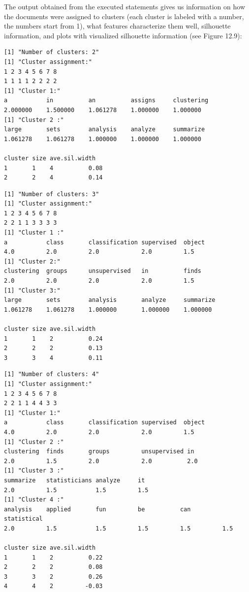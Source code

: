 The output obtained from the executed statements gives us information on how the documents were assigned to clusters (each cluster is labeled with a number, the numbers start from 1), what features characterize them well, silhouette information, and plots with visualized silhouette information (see Figure 12.9):

\begin{lstlisting}
[1] "Number of clusters: 2"
[1] "Cluster assignment:"
1 2 3 4 5 6 7 8
1 1 1 1 2 2 2 2
[1] "Cluster 1:"
a           in          an          assigns     clustering
2.000000    1.500000    1.061278    1.000000    1.000000
[1] "Cluster 2 :"
large       sets        analysis    analyze     summarize
1.061278    1.061278    1.000000    1.000000    1.000000

cluster size ave.sil.width
1       1    4          0.08
2       2    4          0.14
\end{lstlisting}

\begin{lstlisting}
[1] "Number of clusters: 3"
[1] "Cluster assignment:"
1 2 3 4 5 6 7 8
2 2 1 1 3 3 3 3
[1] "Cluster 1 :"
a           class       classification supervised  object
4.0         2.0         2.0            2.0         1.5
[1] "Cluster 2:"
clustering  groups      unsupervised   in          finds
2.0         2.0         2.0            2.0         1.5
[1] "Cluster 3:"
large       sets        analysis       analyze     summarize
1.061278    1.061278    1.000000       1.000000    1.000000

cluster size ave.sil.width
1       1    2          0.24
2       2    2          0.13
3       3    4          0.11
\end{lstlisting}

\begin{lstlisting}
[1] "Number of clusters: 4"
[1] "Cluster assignment:"
1 2 3 4 5 6 7 8
2 2 1 1 4 4 3 3
[1] "Cluster 1:"
a           class       classification supervised  object
4.0         2.0         2.0            2.0         1.5
[1] "Cluster 2 :"
clustering  finds       groups         unsupervised in
2.0         1.5         2.0            2.0          2.0
[1] "Cluster 3 :"
summarize   statisticians analyze     it
2.0         1.5           1.5         1.5
[1] "Cluster 4 :"
analysis    applied       fun         be          can         statistical
2.0         1.5           1.5         1.5         1.5         1.5

cluster size ave.sil.width
1       1    2          0.22
2       2    2          0.08
3       3    2          0.26
4       4    2         -0.03
\end{lstlisting}

